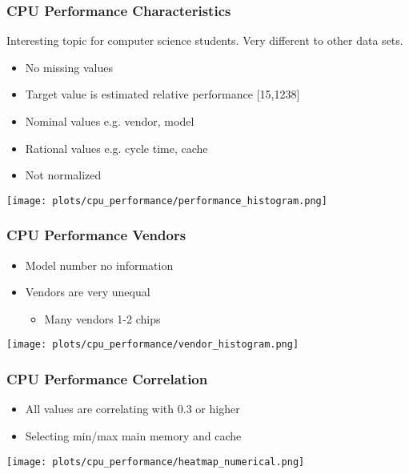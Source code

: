 \documentclass[aspectratio=169]{beamer}
\begin{document}
\begin{frame}{}
\frametitle{CPU Performance Characteristics}
Interesting topic for computer science students. Very different to other data sets.
\begin{minipage}{0.3\textwidth}
\begin{itemize}
\item No missing values
\item Target value is estimated relative performance [15,1238]
\item Nominal values e.g. vendor, model
\item Rational values e.g. cycle time, cache
\item Not normalized
\end{itemize}
\end{minipage}
\begin{minipage}{0.69\textwidth}
    \texttt{[image: plots/cpu\_performance/performance\_histogram.png]}
\end{minipage}
\end{frame}

\begin{frame}{}
\frametitle{CPU Performance Vendors}
\begin{minipage}{0.3\textwidth}
\begin{itemize}
\item Model number no information
\item Vendors are very unequal
\begin{itemize}
	\item Many vendors 1-2 chips
\end{itemize}
\end{itemize}
\end{minipage}
\begin{minipage}{0.69\textwidth}
    \texttt{[image: plots/cpu\_performance/vendor\_histogram.png]}
\end{minipage}
\end{frame}

\begin{frame}{}
\frametitle{CPU Performance Correlation}
\begin{itemize}
	\item All values are correlating with 0.3 or higher
	\item Selecting min/max main memory and cache
\end{itemize}
    \center \texttt{[image: plots/cpu\_performance/heatmap\_numerical.png]}
\end{frame}
\end{document}
